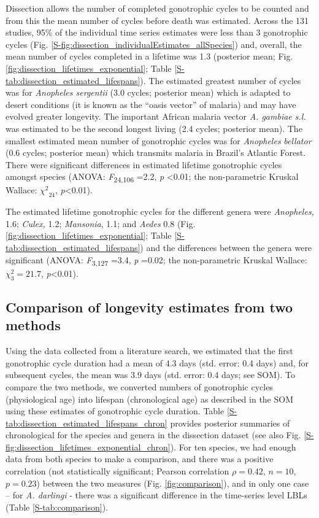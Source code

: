 \documentclass[]{article}
\begin{document}
Dissection allows the number of completed gonotrophic cycles to be
counted and from this the mean number of cycles before death was
estimated. Across the 131 studies, 95\% of the individual time series estimates were less than 3 gonotrophic cycles (Fig. \ref{S-fig:dissection_individualEstimates_allSpecies}) and, overall, the mean number of cycles completed in a lifetime
was 1.3 (posterior mean; Fig. \ref{fig:dissection_lifetimes_exponential}; Table \ref{S-tab:dissection_estimated_lifespans}). The
estimated greatest number of cycles was for \emph{Anopheles sergentii}
(3.0 cycles; posterior mean) which is adapted to desert conditions (it
is known as the ``oasis vector'' of malaria) and may have evolved
greater longevity. The important African malaria vector \emph{A.
gambiae s.l.} was estimated to be the second longest living (2.4 cycles;
posterior mean). The smallest estimated mean number of gonotrophic
cycles was for \emph{Anopheles} \emph{bellator} (0.6 cycles; posterior
mean) which transmits malaria in Brazil's Atlantic Forest. There were
significant differences in estimated lifetime gonotrophic cycles amongst
species (ANOVA: \emph{F}\textsubscript{24,106} =2.2, \emph{p}
\textless{}0.01; the non-parametric Kruskal Wallace:
\({\chi^{2}}_{24}\), \emph{p}\textless{}0.01).

The estimated lifetime gonotrophic cycles for the different genera were
\emph{Anopheles,} 1.6; \emph{Culex,} 1.2; \emph{Mansonia}, 1.1; and
\emph{Aedes} 0.8 (Fig. \ref{fig:dissection_lifetimes_exponential}; Table \ref{S-tab:dissection_estimated_lifespans}) and the differences between the genera were
significant (ANOVA: \emph{F}\textsubscript{3,127} =3.4, \emph{p} =0.02;
the non-parametric Kruskal Wallace: \(\chi_{3}^{2} = 21.7\),
\emph{p}\textless{}0.01).

\subsection{Comparison of longevity estimates from two
methods}\label{comparison-of-longevity-estimates-from-two-methods}

Using the data collected from a literature search, we estimated that the first gonotrophic cycle duration had a mean of 4.3 days (std. error: 0.4 days) and, for subsequent cycles, the mean was 3.9 days (std. error: 0.4 days; see SOM). To compare the two methods, we converted numbers of gonotrophic cycles
(physiological age) into lifespan (chronological age) as described in
the SOM using these estimates of gonotrophic cycle duration. Table \ref{S-tab:dissection_estimated_lifespans_chron} provides posterior summaries of chronological for the species and genera in the dissection dataset (see also Fig. \ref{S-fig:dissection_lifetimes_exponential_chron}). For ten species, we had enough data from both species to make a comparison, and there was a positive correlation (not
statistically significant; Pearson correlation $\rho=0.42$, $n=10$, $p=0.23$)
between the two measures (Fig. \ref{fig:comparison}), and in only one case -- for \emph{A.
darlingi} - there was a significant difference in the
time-series level LBLs (Table \ref{S-tab:comparison}).
\end{document}
